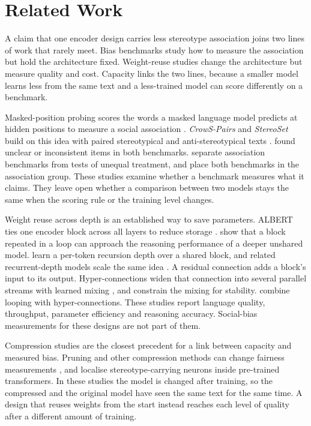 \documentclass[sigconf,natbib=true]{acmart}
\begin{document}
\section{Related Work}
\label{sec:related}

A claim that one encoder design carries less stereotype association joins two
lines of work that rarely meet. Bias benchmarks study how to measure the
association but hold the architecture fixed. Weight-reuse studies change the
architecture but measure quality and cost. Capacity links the two lines, because
a smaller model learns less from the same text and a less-trained model can score
differently on a benchmark.

Masked-position probing scores the words a masked language model predicts at
hidden positions to measure a social association
\citep{kurita2019measuring}. \emph{CrowS-Pairs} and \emph{StereoSet} build on
this idea with paired stereotypical and anti-stereotypical texts
\citep{nangia2020crows,nadeem2021stereoset}. \citet{blodgett2021salmon} found
unclear or inconsistent items in both benchmarks. \citet{wang2025difference}
separate association benchmarks from tests of unequal treatment, and place both
benchmarks in the association group. These studies examine whether a benchmark
measures what it claims. They leave open whether a comparison between two
models stays the same when the scoring rule or the training level changes.

Weight reuse across depth is an established way to save parameters. ALBERT ties
one encoder block across all layers to reduce storage \citep{lan2020albert}.
\citet{saunshi2025looped} show that a block repeated in a loop can approach the
reasoning performance of a deeper unshared model. \citet{bae2025mor} learn a
per-token recursion depth over a shared block, and related recurrent-depth
models scale the same idea \citep{geiping2025huginn,zhu2025ouro,frey2026adaptive}.
A residual connection adds a block's input to its output.
Hyper-connections widen that connection into several parallel streams with
learned mixing \citep{zhu2025hyperconnections}, and \citet{xie2025mhc} constrain
the mixing for stability. \citet{zeitoun2026hyperloop} combine looping with
hyper-connections. These studies report language quality, throughput, parameter
efficiency and reasoning accuracy. Social-bias measurements for these designs are
not part of them.

Compression studies are the closest precedent for a link between capacity and
measured bias. Pruning and other compression methods can change fairness
measurements \citep{hooker2020characterising,xu2022compression,ramesh2023comparative},
and \citet{voria2026tracing} localise stereotype-carrying neurons inside
pre-trained transformers. In these studies the model is changed after training,
so the compressed and the original model have seen the same text for the same
time. A design that reuses weights from the start instead reaches each level of
quality after a different amount of training.
\end{document}
